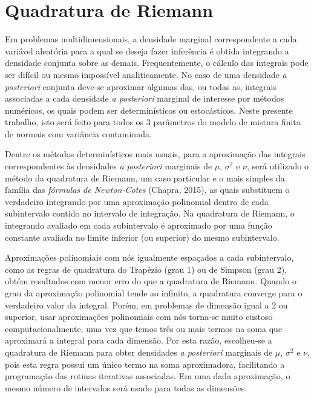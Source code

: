 \section{Quadratura de Riemann}\label{quarie}

Em problemas multidimensionais, a densidade marginal correspondente a cada variável aleatória para a qual se deseja fazer inferência é obtida integrando a densidade conjunta sobre as demais. Frequentemente, o cálculo das integrais pode ser difícil ou mesmo impossível analiticamente. No caso de uma densidade \textit{a posteriori} conjunta deve-se aproximar algumas das, ou todas as, integrais associadas a cada densidade \textit{a posteriori} marginal de interesse por métodos numéricos, os quais podem ser determinísticos ou estocásticos. Neste presente trabalho, isto será feito para todos os 3 parâmetros do modelo de mistura finita de normais com variância contaminada.

Dentre os métodos determinísticos mais usuais, para a aproximação das integrais correspondentes às densidades \textit{a posteriori} marginais de $\mu$, $\sigma^2$ e $\nu$, será utilizado o método da quadratura de Riemann, um caso particular e o mais simples da família das \textit{fórmulas de Newton-Cotes} (Chapra, 2015)\cite{Chapra2015}, as quais substituem o verdadeiro integrando por uma aproximação polinomial dentro de cada subintervalo contido no intervalo de integração. Na quadratura de Riemann, o integrando avaliado em cada subintervalo é aproximado por uma função constante avaliada no limite inferior (ou superior) do mesmo subintervalo.

Aproximações polinomiais com nós igualmente espaçados a cada subintervalo, como as regras de quadratura do Trapézio (grau 1) ou de Simpson (grau 2), obtém resultados com menor erro do que a quadratura de Riemann. Quando o grau da aproximação polinomial tende ao infinito, a quadratura converge para o verdadeiro valor da integral. Porém, em problemas de dimensão igual a 2 ou superior, usar aproximações polinomiais com nós torna-se muito custoso computacionalmente, uma vez que temos três ou mais termos na soma que aproximará a integral para cada dimensão. Por esta razão, escolheu-se a quadratura de Riemann para obter densidades \textit{a posteriori} marginais de $\mu$, $\sigma^2$ e $\nu$, pois esta regra possui um único termo na soma aproximadora, facilitando a programação das rotinas iterativas associadas. Em uma dada aproximação, o mesmo número de intervalos será usado para todas as dimensões.

